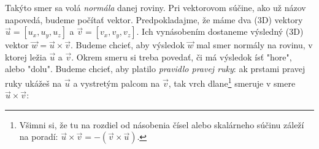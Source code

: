 {}



Takýto smer sa volá {\em normála} danej roviny. 
Pri vektorovom súčine, ako už názov napovedá, budeme počítať
vektor. Predpokladajme, že máme dva (3D) vektory $\vec u=[u_x,u_y,u_z]$ a $\vec v=[v_x,v_y,v_z]$.
Ich vynásobením dostaneme výsledný (3D) vektor $\vec w = \vec u\times\vec v$. Budeme chcieť, aby výsledok
$\vec w$ mal smer normály na rovinu, v ktorej ležia $\vec u$ a $\vec v$.
Okrem smeru si treba povedať, či má výsledok ísť "hore", alebo "dolu". Budeme chcieť,
aby platilo {\em pravidlo pravej ruky}: ak prstami pravej ruky ukážeš na $\vec u$ a 
vystretým palcom na $\vec v$, tak vrch dlane\footnote{
Všimni si, že tu 
na rozdiel od násobenia čísel alebo skalárneho súčinu záleží na poradí: 
$\vec u\times\vec v = - (\vec v\times\vec u)$.}
smeruje v smere $\vec u\times\vec v$:



\def\drawaxes{
    \draw[->,red, shorten >= 1ex] (0,0,0) -- (1,0,0) node{$x$};
    \draw[->,blue, shorten >= 1ex] (0,0,0) -- (0,1,0) node{$y$};
    \draw[->,teal, shorten >= 1ex] (0,0,0) -- (0,0,1) node {$z$};
  }


